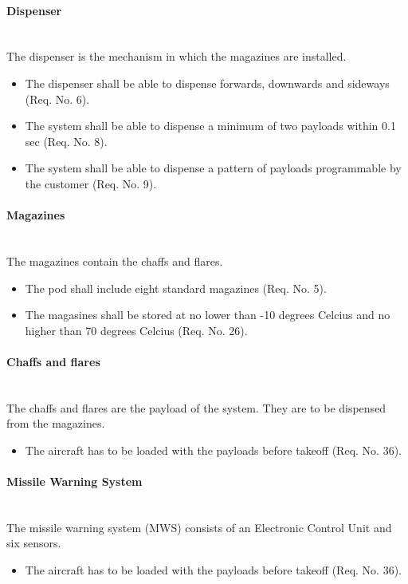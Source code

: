 \paragraph{Dispenser}\mbox{}\\
The dispenser is the mechanism in which the magazines are installed.
\begin{itemize}
\item The dispenser shall be able to dispense forwards, downwards and sideways (Req. No. 6). 
\item The system shall be able to dispense a minimum of two payloads within 0.1 sec (Req. No. 8).
\item The system shall be able to dispense a pattern of payloads programmable by the customer (Req. No. 9).
\end{itemize}

\paragraph{Magazines}\mbox{}\\
The magazines contain the chaffs and flares.
\begin{itemize}
\item The pod shall include eight standard magazines (Req. No. 5).
\item The magasines shall be stored at no lower than -10 degrees Celcius and no higher than 70 degrees Celcius (Req. No. 26).
\end{itemize}

\paragraph{Chaffs and flares}\mbox{}\\
The chaffs and flares are the payload of the system. They are to be dispensed from the magazines.
\begin{itemize}
\item The aircraft has to be loaded with the payloads before takeoff (Req. No. 36).
\end{itemize}

\paragraph{Missile Warning System}\mbox{}\\
The missile warning system (MWS) consists of an Electronic Control Unit and six sensors.
\begin{itemize}
\item The aircraft has to be loaded with the payloads before takeoff (Req. No. 36).
\end{itemize}

